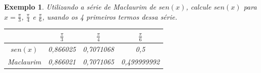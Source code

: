 \documentclass[12pt,a4paper]{book}
\newtheorem{example}{Exemplo}
\numberwithin{example}{chapter}
\numberwithin{remark}{chapter}
\begin{document}
\begin{example}
    Utilizando a série de Maclaurim de $sen(x)$, calcule $sen(x)$ para $x=\frac{\pi}{3}$, $\frac{\pi}{4}$ e $\frac{\pi}{6}$, usando os 4 primeiros termos dessa série.

    \begin{center}
    	\begin{tabular}{|c|c|c|c|}
	    	\hline
        	 & $\frac{\pi}{3}$ & $\frac{\pi}{4}$ & $\frac{\pi}{6}$ \\
    	    \hline
	        $sen(x)$     & 0,866025 & 0,7071068 & 0,5 \\
        	\hline
	        Maclaurim    & 0,866021 & 0,7071065 & 0,499999992 \\
    	    \hline
	    \end{tabular}
	\end{center}
\end{example}
\end{document}
